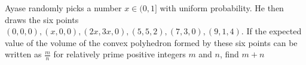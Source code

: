 Ayase randomly picks a number $x \in (0, 1]$ with uniform probability. He then draws the six points $(0, 0, 0),(x, 0, 0),(2x, 3x, 0),(5, 5, 2),(7, 3, 0),(9, 1, 4)$. If the expected value of the volume of the convex polyhedron formed by these six points can be written as $\frac{m}{n}$ for relatively prime positive integers $m$ and $n$, find $m + n$